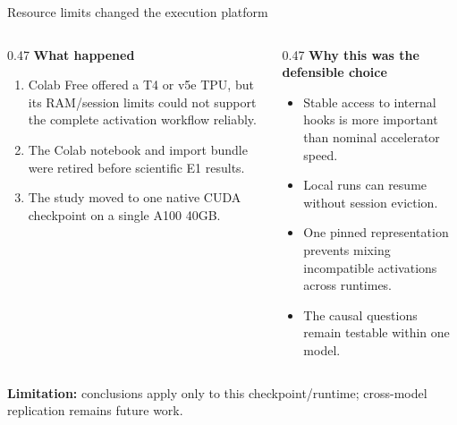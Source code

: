 \documentclass[aspectratio=169,11pt]{beamer}
\begin{document}
\begin{frame}{Resource limits changed the execution platform}
  \footnotesize
  \begin{columns}[T,onlytextwidth]
    \begin{column}{0.47\textwidth}
      \textbf{What happened}\par\vspace{0.15cm}
      \begin{enumerate}\setlength\itemsep{0.06cm}
        \item Colab Free offered a T4 or v5e TPU, but its RAM/session limits could not support the complete activation workflow reliably.
        \item The Colab notebook and import bundle were retired before scientific E1 results.
        \item The study moved to one native CUDA checkpoint on a single A100 40GB.
      \end{enumerate}
    \end{column}
    \begin{column}{0.47\textwidth}
      \textbf{Why this was the defensible choice}\par\vspace{0.15cm}
      \begin{itemize}\setlength\itemsep{0.06cm}
        \item Stable access to internal hooks is more important than nominal accelerator speed.
        \item Local runs can resume without session eviction.
        \item One pinned representation prevents mixing incompatible activations across runtimes.
        \item The causal questions remain testable within one model.
      \end{itemize}
    \end{column}
  \end{columns}
  \vspace{0.15cm}
  {\scriptsize\color{Red}\textbf{Limitation:} conclusions apply only to this checkpoint/runtime; cross-model replication remains future work.}
\end{frame}
\end{document}
